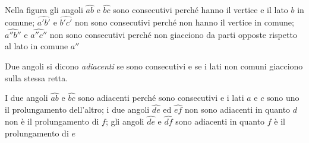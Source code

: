 \begin{inaccessibleblock}
 \begin{center} 
 
 \end{center}
\end{inaccessibleblock}
Nella figura gli angoli  \(\widehat{ab}\) e \(\widehat{bc}\)  
sono consecutivi perché hanno il vertice e il lato \( b \) in comune;  
\(\widehat {a'b'}\) e \(\widehat {b'c'}\)  non sono consecutivi perché 
non hanno il vertice in comune;  \(\widehat {a''b''}\) e \(\widehat 
{a''c''}\) non sono consecutivi perché non giacciono da parti opposte 
rispetto al lato in comune \(a''\)

\begin{definizione}
Due angoli si dicono \emph{adiacenti} se sono consecutivi e se i lati 
non comuni giacciono sulla stessa retta.
\end{definizione}

\begin{inaccessibleblock}
 \begin{center} 
  
 \end{center}
\end{inaccessibleblock}
I due angoli \(\widehat{ab}\) e \(\widehat{bc}\) sono adiacenti 
perché sono consecutivi e i lati \(a\) e \(c\) sono uno il prolungamento 
dell'altro; i due angoli \(\widehat{de}\) ed \(\widehat{ef}\) non sono 
adiacenti in quanto \(d\) non è il prolungamento di \(f\); gli angoli 
\(\widehat{de}\) e \(\widehat{df}\) sono adiacenti in quanto \(f\) è il 
prolungamento di \(e\)

